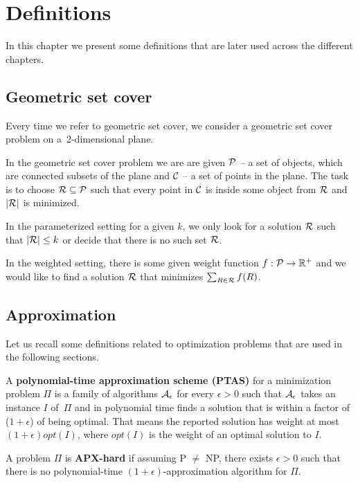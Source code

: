 \chapter{Definitions}

In this chapter we present some definitions that are later used
across the different chapters.

\section{Geometric set cover}
Every time we refer to geometric set cover,
we consider a geometric set cover problem
on a~2-dimensional plane.

In the geometric set cover problem we are are given
$\mathcal{P}$ -- a set of objects, which are connected
subsets of the plane and $\mathcal{C}$ -- a set of points in the plane.
The task is to choose $\mathcal{R} \subseteq \mathcal{P}$ such that
every point in $\mathcal{C}$ is inside some object from $\mathcal{R}$
and $|\mathcal{R}|$ is minimized.

In the parameterized setting for a given $k$,
we only look for a solution $\mathcal{R}$ such that $|\mathcal{R}| \le k$
or decide that there is no such set $\mathcal{R}$.

In the weighted setting, there is some given weight function
$f : \mathcal{P} \rightarrow \mathbb{R^+}$
and we would like to find a solution $\mathcal{R}$
that minimizes $\sum_{R \in \mathcal{R}} f(R)$.

\section{Approximation}

Let us recall some definitions related to optimization problems
that are used in the following sections.

\begin{defi}
A \textbf{polynomial-time approximation scheme (PTAS)}
for a minimization problem $\Pi$
is a family of algorithms $\cal{A}_\epsilon$ for
every $\epsilon > 0$
such that $\cal{A}_\epsilon$ takes an instance $I$ of~$\Pi$
and in polynomial time
finds a solution that is within a factor
of ($1+\epsilon$) of being optimal.
That means the reported solution has weight at most
$(1+\epsilon)opt(I)$, where $opt(I)$ is the weight
of an optimal solution to $I$.
\end{defi}

\begin{defi}
A problem $\Pi$ is \textbf{APX-hard} if assuming P $\neq$ NP,
there exists $\epsilon > 0$
such that there is no polynomial-time $(1+\epsilon)$-approximation algorithm
for $\Pi$.
\end{defi}

